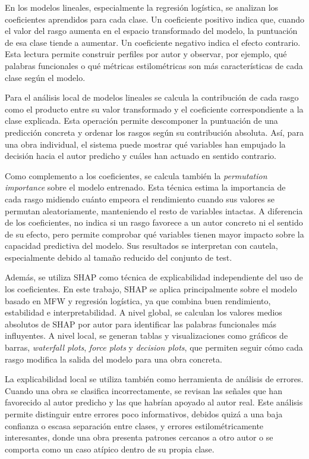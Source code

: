 \documentclass[IB]{TFUOC}%
\begin{document}
En los modelos lineales, especialmente la regresión logística, se analizan los coeficientes aprendidos para cada clase. Un coeficiente positivo indica que, cuando el valor del rasgo aumenta en el espacio transformado del modelo, la puntuación de esa clase tiende a aumentar. Un coeficiente negativo indica el efecto contrario. Esta lectura permite construir perfiles por autor y observar, por ejemplo, qué palabras funcionales o qué métricas estilométricas son más características de cada clase según el modelo.

Para el análisis local de modelos lineales se calcula la contribución de cada rasgo como el producto entre su valor transformado y el coeficiente correspondiente a la clase explicada. Esta operación permite descomponer la puntuación de una predicción concreta y ordenar los rasgos según su contribución absoluta. Así, para una obra individual, el sistema puede mostrar qué variables han empujado la decisión hacia el autor predicho y cuáles han actuado en sentido contrario.

Como complemento a los coeficientes, se calcula también la \textit{permutation importance} sobre el modelo entrenado. Esta técnica estima la importancia de cada rasgo midiendo cuánto empeora el rendimiento cuando sus valores se permutan aleatoriamente, manteniendo el resto de variables intactas. A diferencia de los coeficientes, no indica si un rasgo favorece a un autor concreto ni el sentido de su efecto, pero permite comprobar qué variables tienen mayor impacto sobre la capacidad predictiva del modelo. Sus resultados se interpretan con cautela, especialmente debido al tamaño reducido del conjunto de test.

Además, se utiliza SHAP como técnica de explicabilidad independiente del uso de los coeficientes. En este trabajo, SHAP se aplica principalmente sobre el modelo basado en MFW y regresión logística, ya que combina buen rendimiento, estabilidad e interpretabilidad. A nivel global, se calculan los valores medios absolutos de SHAP por autor para identificar las palabras funcionales más influyentes. A nivel local, se generan tablas y visualizaciones como gráficos de barras, \textit{waterfall plots}, \textit{force plots} y \textit{decision plots}, que permiten seguir cómo cada rasgo modifica la salida del modelo para una obra concreta.

La explicabilidad local se utiliza también como herramienta de análisis de errores. Cuando una obra se clasifica incorrectamente, se revisan las señales que han favorecido al autor predicho y las que habrían apoyado al autor real. Este análisis permite distinguir entre errores poco informativos, debidos quizá a una baja confianza o escasa separación entre clases, y errores estilométricamente interesantes, donde una obra presenta patrones cercanos a otro autor o se comporta como un caso atípico dentro de su propia clase.
\end{document}
